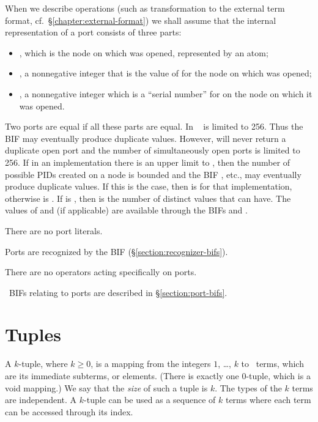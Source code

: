 When we describe operations (such as transformation to the external
term format, cf.~\S\ref{chapter:external-format}) we shall assume that
the internal representation of a port  consists of three parts:
\begin{itemize}
\item {}, which is the node on which  was opened, represented by
an atom;
\item {}, a nonnegative integer that is the value of
 for the node  on which  was opened;
\item {}, a nonnegative integer which is a
``serial number'' for  on the node on which it was opened.
\end{itemize}
Two ports are equal if all these parts are equal.
\ifOld
In \OldErlang\  is limited to 256.  Thus the BIF 
may eventually produce duplicate values.  However,  will never
return a duplicate open port and the number of simultaneously open ports is
limited to 256.
\fi
\ifStd
If in an implementation there is an upper limit to , then the number
of possible PIDs created on a node is bounded and the BIF , etc.,
may eventually produce duplicate values.  If this is the case,
then  is  for that implementation, otherwise
 is .  If  is , then
 is the number of distinct values that  can have.
The values of  and  (if applicable) are available
through the BIFs  and .
\fi

There are no port literals.

Ports are recognized by the BIF \ifStd{}\else{}\fi
(\S\ref{section:recognizer-bifs}).

There are no operators acting specifically on ports.

\Erlang\ BIFs relating to ports are described in \S\ref{section:port-bifs}.

\section{Tuples}

\label{section:tuples}

A $k$-tuple, where $k\geq0$, is a mapping from the integers $1$,
\ldots, $k$ to \Erlang\ terms, which are its
immediate subterms, or elements.
(There is exactly one $0$-tuple,
which is a void mapping.)  We say that the \emph{size} of such
a tuple is $k$.  The types of the $k$ terms are
independent.  A $k$-tuple can be used as a sequence of $k$ terms
where each term can be accessed through its index.

